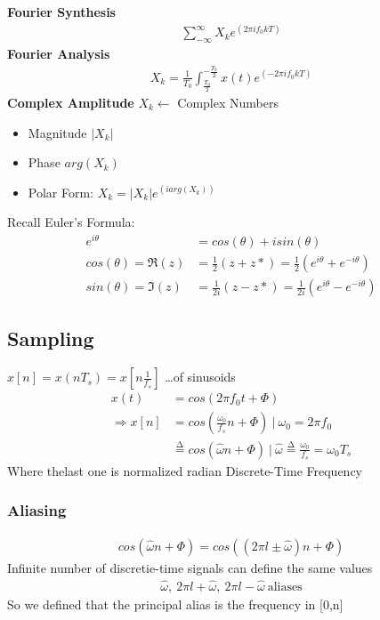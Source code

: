 \documentclass{article}
\begin{document}
            \textbf{Fourier Synthesis}
                \begin{align}
                    \sum_{-\infty}^{\infty}{X_k e^{(2\pi i f_0 k T)}}
                \end{align}
            \textbf{Fourier Analysis}
                \begin{align}
                    X_k = \frac{1}{T_0}\int_{\frac{T_0}{2}}^{-\frac{T_0}{2}}{x(t)e^{(-2\pi i f_0 k T)}}
                \end{align}
            \textbf{Complex Amplitude}
                $X_k\leftarrow$ Complex Numbers
                \renewcommand{\labelitemi}{\textendash}
                \begin{itemize}
                    \item Magnitude $|X_k|$
                    \item Phase $arg(X_k)$
                    \item Polar Form: $X_k = |X_k|e^(iarg(X_k))$
                \end{itemize}
                Recall Euler's Formula:
                \begin{align}
                    e^{i\theta} &= cos(\theta) + isin(\theta)\\
                    cos(\theta) = \Re(z) &= \frac{1}{2} (z+z*) = \frac{1}{2}(e^{i\theta} + e^{-i\theta})\\
                    sin(\theta) = \Im(z)&= \frac{1}{2i}(z-z*) = \frac{1}{2i}(e^{i\theta} - e^{-i\theta})
                \end{align}
                \renewcommand{\labelitemi}{\textbullet}
    \subsection{Sampling}
            $x[n] = x(nT_s) = x[n\frac{1}{f_s}]$ \dots of sinusoids
            \begin{align}
                x(t) &= cos(2 \pi f_0 t + \Phi)\\
                \Rightarrow x[n] &= cos(\frac{\omega_0}{f_s}n + \Phi)~|~\omega_0 = 2\pi f_0\\
                &\overset{\mathrm{\Delta}}{=} cos(\hat{\omega}n + \Phi)~|~
                    \hat{\omega} \overset{\mathrm{\Delta}}{=} \frac{\omega_0}{f_s} = \omega_0 T_s
            \end{align}
            Where thelast one is normalized radian Discrete-Time Frequency
                \subsubsection{Aliasing}
                \begin{align}
                    cos(\hat{\omega}n + \Phi) = cos((2\pi l\pm\hat{\omega})n + \Phi)
                \end{align}
                    Infinite number of discretie-time signals can define the same values
                \begin{align}
                    \hat{\omega},~2\pi l + \hat{\omega},~2\pi l - \hat{\omega}~\text{aliases}
                \end{align}
                    So we defined that the principal alias is the frequency in [0,n]
\end{document}
